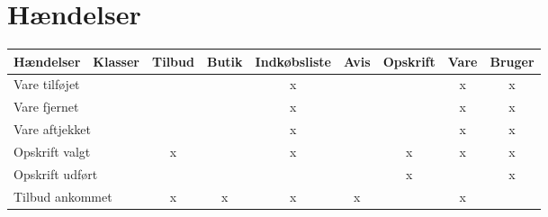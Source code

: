 \section{Hændelser}
\begin{table}[h]
\begin{tabular}{|l|l|c|c|c|c|c|c|c|}
\hline
Hændelser                  & Klasser                & \multicolumn{1}{l|}{Tilbud} & \multicolumn{1}{l|}{Butik} & \multicolumn{1}{l|}{Indkøbsliste} & \multicolumn{1}{l|}{Avis} & \multicolumn{1}{l|}{Opskrift} & \multicolumn{1}{l|}{Vare} & \multicolumn{1}{l|}{Bruger} \\ \hline
\multicolumn{2}{|l|}{Vare tilføjet}                 &                             &                            & x                                 &                           &                               & x                         & x                           \\ \hline
\multicolumn{2}{|l|}{Vare fjernet}                  &                             &                            & x                                 &                           &                               & x                         & x                           \\ \hline
\multicolumn{2}{|l|}{Vare aftjekket}                &                             &                            & x                                 &                           &                               & x                         & x                           \\ \hline
\multicolumn{2}{|l|}{Opskrift valgt}                & x                           &                            & x                                 &                           & x                             & x                         & x                           \\ \hline
\multicolumn{2}{|l|}{Opskrift udført}               &                             &                            &                                   &                           & x                             &                           & x                           \\ \hline
\multicolumn{2}{|l|}{Tilbud ankommet}               & x                           & x                          & x                                 & x                         &                               & x                         &                             \\ \hline

\end{tabular}
\end{table}
